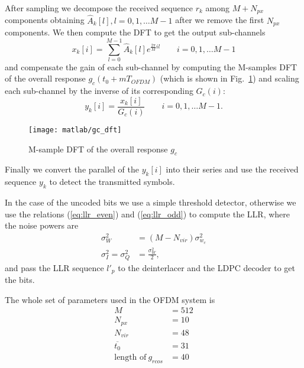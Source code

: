 \documentclass[a4paper,oneside]{article}
\begin{document}
After sampling we decompose the received sequence $r_k$ among $M+N_{px}$ components obtaining $\hat{A}_k[l], l = 0,1,\dots M-1$ after we remove the first $N_{px}$ components. We then compute the DFT to get the output sub-channels
\begin{equation}
  x_k[i] = \sum_{l=0}^{M-1}\hat{A}_k[l]e^{\frac{2\pi}{M}il} \qquad i=0,1,\dots M-1
\end{equation}
and compensate the gain of each sub-channel by computing the M-samples
DFT of the overall response $g_c(t_0 + mT_{OFDM})$ (which is shown in
Fig.~\ref{plot:gc_dft}) and scaling each sub-channel by the inverse of
its corresponding $G_c(i)$:
\begin{equation}
  y_k[i] = \frac{x_k[i]}{G_c(i)} \qquad i=0,1,\dots M-1 .
\end{equation}
\begin{figure}[htbp]
  \centering
  \texttt{[image: matlab/gc\_dft]}
  \caption{M-sample DFT of the overall response $g_c$}
  \label{plot:gc_dft}
\end{figure}

Finally we convert the parallel of the $y_k[i]$ into their series and use the received sequence $y_k$ to detect the transmitted symbols.

In the case of the uncoded bits we use a simple threshold detector,
otherwise we use the relations (\ref{eq:llr_even}) and
(\ref{eq:llr_odd}) to compute the LLR, where the noise powers are
\begin{align}
  \sigma_W^2 &= (M-N_{vir})\sigma^2_{w_c} \\
  \sigma^2_I = \sigma^2_Q &= \frac{\sigma_W^2}{2} ,
\end{align}
and pass the LLR sequence $l'_p$ to the deinterlacer and the LDPC
decoder to get the bits.

The whole set of parameters used in the OFDM system is
\begin{align}
  M &= 512 \\
    N_{px} &= 10 \\
    N_{vir} &= 48 \\
    \overline{t_0} &= 31 \\
    \text{length of} \  g_{rcos} &= 40
\end{align}
\end{document}

